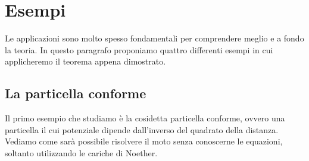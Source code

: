 \section{Esempi}

    Le applicazioni sono molto spesso fondamentali per comprendere meglio e a fondo la teoria. In questo paragrafo proponiamo quattro differenti esempi in cui applicheremo il teorema appena dimostrato. 

\subsection{La particella conforme}
    Il primo esempio che studiamo è la cosidetta particella conforme, ovvero una particella il cui potenziale dipende dall'inverso del quadrato della distanza. Vediamo come sarà possibile risolvere il moto senza conoscerne le equazioni, soltanto utilizzando le cariche di Noether. 

